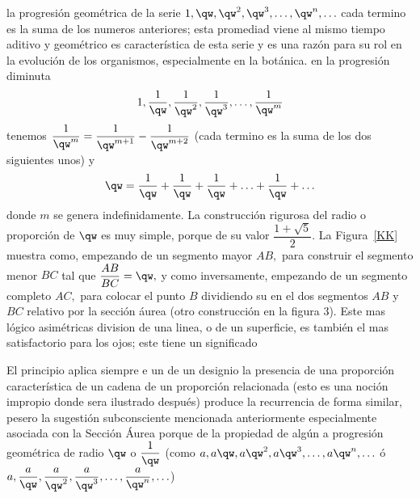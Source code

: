   la progresión geométrica  de la serie $1,\qw,\qw^2,\qw^3,\ldots,\qw^n,\ldots$ cada termino es la suma de los numeros anteriores; esta promediad viene al mismo tiempo aditivo y geométrico es característica de esta serie y es una razón para su rol en la evolución de los organismos, especialmente en la botánica.
   en la progresión diminuta  $$1,\dfrac{1}{\qw},\dfrac{1}{\qw^2},\dfrac{1}{\qw^3},\ldots,\dfrac{1}{\qw^m}$$ tenemos  $\dfrac{1}{\qw^m}=\dfrac{1}{\qw^{m+1}}-\dfrac{1}{\qw^{m+2}}$ (cada termino es la suma de los dos siguientes  unos) y $$\qw=\dfrac{1}{\qw}+\dfrac{1}{\qw}+\dfrac{1}{\qw}+\ldots+\dfrac{1}{\qw}+\ldots$$ donde $m$ se genera indefinidamente.
   La construcción rigurosa  del radio o proporción de $\qw$ es muy simple, porque de su valor $\dfrac{1+\sqrt{5}}{2}.$ La Figura~\ref{KK} muestra como, empezando de un segmento mayor  $AB,$ para construir el segmento  menor $BC$ tal que $\dfrac{AB}{BC}=\qw,$ y como inversamente, empezando de un segmento completo $AC,$ para colocar el punto  $B$ dividiendo  su en el dos segmentos $AB$ y $BC$ relativo por la sección áurea  (otro construcción en la figura 3). Este mas lógico asimétricas division de una linea, o de un superficie, es también el mas satisfactorio para los ojos; este tiene un significado







   El principio aplica siempre e un de un designio la presencia de una proporción característica  de un cadena  de un proporción relacionada (esto es una noción impropio  donde sera ilustrado después) produce la recurrencia de forma similar, pesero la sugestión subconsciente mencionada anteriormente especialmente asociada con la Sección Áurea porque de la propiedad de algún a progresión geométrica de radio $\qw$ o $\dfrac{1}{\qw}$ (como $a,a\qw,a\qw^2,a\qw^3,\ldots,a\qw^n,\ldots$  ó $a, \dfrac{a}{\qw},\dfrac{a}{\qw^2},\dfrac{a}{\qw^3},\ldots,\dfrac{a}{\qw^n},\ldots$)



